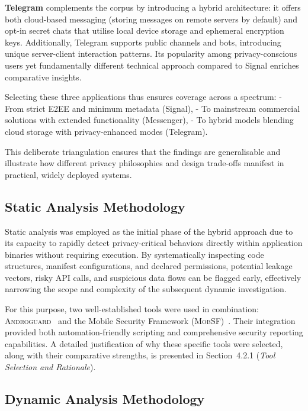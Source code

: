 \documentclass[a4paper,12pt]{report}
\begin{document}
\textbf{Telegram} complements the corpus by introducing a hybrid architecture: it offers both cloud-based messaging (storing messages on remote servers by default) and opt-in secret chats that utilise local device storage and ephemeral encryption keys. Additionally, Telegram supports public channels and bots, introducing unique server-client interaction patterns. Its popularity among privacy-conscious users yet fundamentally different technical approach compared to Signal enriches comparative insights.

Selecting these three applications thus ensures coverage across a spectrum:
- From strict E2EE and minimum metadata (Signal),
- To mainstream commercial solutions with extended functionality (Messenger),
- To hybrid models blending cloud storage with privacy-enhanced modes (Telegram).

This deliberate triangulation ensures that the findings are generalisable and illustrate how different privacy philosophies and design trade-offs manifest in practical, widely deployed systems.

\subsection{Static Analysis Methodology}

Static analysis was employed as the initial phase of the hybrid approach due to its capacity to rapidly detect privacy-critical behaviors directly within application binaries without requiring execution. By systematically inspecting code structures, manifest configurations, and declared permissions, potential leakage vectors, risky API calls, and suspicious data flows can be flagged early, effectively narrowing the scope and complexity of the subsequent dynamic investigation.

For this purpose, two well-established tools were used in combination: \textsc{Androguard}~\cite{androguard2023} and the Mobile Security Framework (\textsc{MobSF})~\cite{mobsf2023}. Their integration provided both automation-friendly scripting and comprehensive security reporting capabilities. A detailed justification of why these specific tools were selected, along with their comparative strengths, is presented in Section~4.2.1 (\emph{Tool Selection and Rationale}).

\subsection{Dynamic Analysis Methodology}
\end{document}
